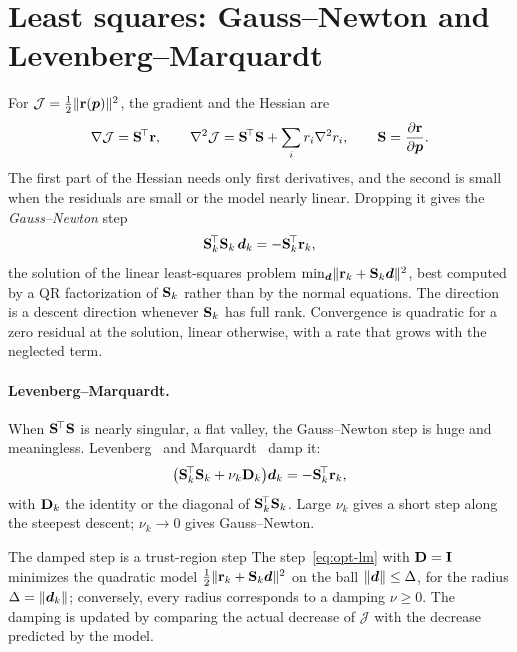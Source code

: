 \section{Least squares: Gauss--Newton and Levenberg--Marquardt}\label{sec:opt-ls}
%
For $\mathcal J=\tfrac12\lVert \mathbf{r}(\bm{p})\rVert^2$, the gradient and the Hessian are
\[
  \nabla\mathcal J=\mathbf{S}^{\!\top}\mathbf{r},\qquad
  \nabla^2\mathcal J=\mathbf{S}^{\!\top}\mathbf{S}+\sum_ir_i\nabla^2r_i,\qquad \mathbf{S}=\frac{\partial\mathbf{r}}{\partial\bm{p}}.
\]
The first part of the Hessian needs only first derivatives, and the second is small
when the residuals are small or the model nearly linear. Dropping it gives the
\emph{Gauss--Newton} step
\begin{equation}\label{eq:opt-gn}
  \mathbf{S}_k^{\!\top}\mathbf{S}_k\,\bm{d}_k=-\mathbf{S}_k^{\!\top}\mathbf{r}_k ,
\end{equation}
the solution of the linear least-squares problem
$\min_{\bm{d}}\lVert \mathbf{r}_k+\mathbf{S}_k\bm{d}\rVert^2$, best computed by a QR factorization
of $\mathbf{S}_k$ rather than by the normal equations. The direction is a descent
direction whenever $\mathbf{S}_k$ has full rank. Convergence is quadratic for a
zero residual at the solution, linear otherwise, with a rate that grows with the
neglected term.

\paragraph{Levenberg--Marquardt.}
%
When $\mathbf{S}^{\!\top}\mathbf{S}$ is nearly singular, a flat valley, the Gauss--Newton step is
huge and meaningless. Levenberg~\cite{Levenberg1944} and
Marquardt~\cite{Marquardt1963} damp it:
\begin{equation}\label{eq:opt-lm}
  \bigl(\mathbf{S}_k^{\!\top}\mathbf{S}_k+\nu_k\mathbf{D}_k\bigr)\bm{d}_k=-\mathbf{S}_k^{\!\top}\mathbf{r}_k ,
\end{equation}
with $\mathbf{D}_k$ the identity or the diagonal of $\mathbf{S}_k^{\!\top}\mathbf{S}_k$. Large
$\nu_k$ gives a short step along the steepest descent; $\nu_k\to0$ gives
Gauss--Newton.
\begin{gbox}{The damped step is a trust-region step}\label{prop:opt-lm}
The step~\eqref{eq:opt-lm} with $\mathbf{D}=\mathbf{I}$ minimizes the quadratic model
$\tfrac12\lVert \mathbf{r}_k+\mathbf{S}_k\bm{d}\rVert^2$ on the ball $\lVert \bm{d}\rVert\le\Delta$, for the
radius $\Delta=\lVert \bm{d}_k\rVert$; conversely, every radius corresponds to a
damping $\nu\ge0$. The damping is updated by comparing the actual decrease of
$\mathcal J$ with the decrease predicted by the model.
\end{gbox}
